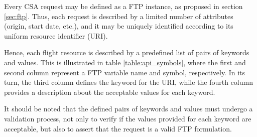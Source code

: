 Every CSA request may be defined as a FTP instance, as proposed in section \ref{sec:ftp}. Thus, each request is described by a limited number of attributes (origin, start date, etc.),  and it may be uniquely identified according to its uniform resource identifier (URI). 

Hence, each flight resource is described by a predefined list of pairs of keywords and values. This is illustrated in table  \ref{table:api_symbols}, where the first and second column represent a FTP variable name and symbol, respectively. In its turn, the third column defines the keyword for the URI, while the fourth column provides a description about the acceptable values for each keyword. 

It should be noted that the defined pairs of keywords and values must undergo a validation process, not only to verify if the values provided for each keyword are acceptable, but also to assert that the request is a valid FTP formulation.


